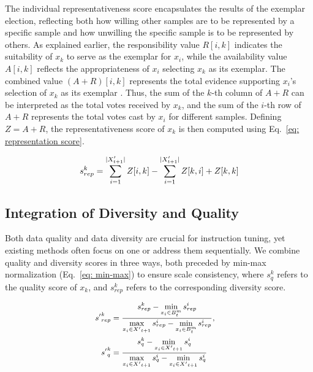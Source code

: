 The individual representativeness score encapsulates the results of the exemplar election, reflecting both how willing other samples are to be represented by a specific sample and how unwilling the specific sample is to be represented by others. 
As explained earlier, the responsibility value \(R[i,k]\) indicates the suitability of \(x_k\) to serve as the exemplar for \(x_i\), while the availability value \(A[i,k]\) reflects the appropriateness of \(x_i\) selecting \(x_k\) as its exemplar. The combined value \((A+R)[i,k]\) represents the total evidence supporting \(x_i\)'s selection of \(x_k\) as its exemplar \citep{cluster-ap}. Thus, the sum of the \(k\)-th column of \(A+R\) can be interpreted as the total votes received by \(x_k\), and the sum of the \(i\)-th row of \(A+R\) represents the total votes cast by \(x_i\) for different samples. Defining \(Z = A + R\), the representativeness score of \(x_k\) is then computed using Eq.~\ref{eq: representation score}.

\begin{equation}
\small
\label{eq: representation score}
        s^k_{rep} = \sum_{i=1}^{|X'_{t+1}|}Z[i, k] - \sum_{i=1}^{|X'_{t+1}|}Z[k, i] + Z[k,k]
\end{equation}

\subsection{Integration of Diversity and Quality}
\label{method: combination}

Both data quality and data diversity are crucial for instruction tuning, yet existing methods often focus on one or address them sequentially. We combine quality and diversity scores in three ways, both preceded by min-max normalization (Eq.~\ref{eq: min-max}) to ensure scale consistency, where $s_q^k$ refers to the quality score of $x_k$, and $s^k_{rep}$ refers to the corresponding diversity score. 



\begin{equation}
\small
\label{eq: min-max}
\begin{aligned}
     {s'}^{k}_{rep} &= \frac{s^{k}_{rep} - \min\limits_{x_{i} \in {B}^m_{t}} s^{i}_{rep}}
        {\max\limits_{x_{i} \in {X'}_{t+1}} s^{i}_{rep} - \min\limits_{x_{i} \in {B}^m_{t}} s^{i}_{rep}},\quad \\
    {s'}_{q}^{k} &= \frac{s_{q}^{k} - \min\limits_{x_{i} \in {X'}_{t+1}} s_{q}^{i}}
        {\max\limits_{x_{i} \in {X'}_{t+1}} s_{q}^{i} - \min\limits_{x_{i} \in {X'}_{t+1}} s_{q}^{i}}
\end{aligned}  
\end{equation}


